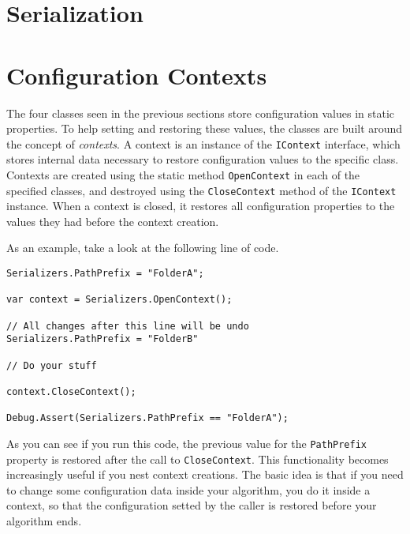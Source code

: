 \section{Serialization}

\section{Configuration Contexts}

The four classes seen in the previous sections
store configuration values in static
properties. To help setting and restoring these values, the
classes are built around the concept of \emph{contexts}.
A context is an instance of the \texttt{IContext} interface,
which stores internal data necessary to restore configuration
values to the specific class. Contexts are created using
the static method \texttt{OpenContext} in each of the
specified classes, and destroyed using the \texttt{CloseContext}
method of the \texttt{IContext} instance. When a context
is closed, it restores all configuration
properties to the values they had before the context creation.

As an example, take a look at the following line of code.

\begin{verbatim}
Serializers.PathPrefix = "FolderA";

var context = Serializers.OpenContext();

// All changes after this line will be undo
Serializers.PathPrefix = "FolderB"

// Do your stuff

context.CloseContext();

Debug.Assert(Serializers.PathPrefix == "FolderA");
\end{verbatim}

As you can see if you run this code, the previous value
for the \texttt{PathPrefix} property is restored after the
call to \texttt{CloseContext}. This functionality
becomes increasingly useful if you nest context creations.
The basic idea is that if you need to change some
configuration data inside your algorithm, you do it inside
a context, so that the configuration setted by the caller
is restored before your algorithm ends. 

